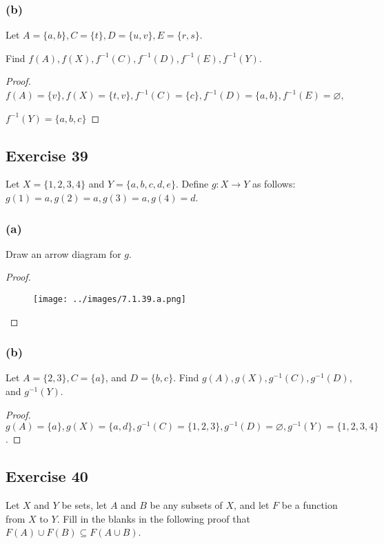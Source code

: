 \documentclass[14pt]{extarticle}
\newcommand{\es}{\varnothing}
\begin{document}
\subsubsection{(b)}
Let \(A = \{a, b\}, C = \{t\}, D = \{u, v\}, E = \{r, s\}\).

Find \(f(A), f(X), f^{-1}(C), f^{-1}(D), f^{-1}(E), f^{-1}(Y)\).

\begin{proof}
    \(f(A) = \{v\}, f(X) = \{t, v\}, f^{-1}(C) = \{c\}, f^{-1}(D) = \{a, b\}, f^{-1}(E) = \es\),

    \(f^{-1}(Y) = \{a,b,c\}\)
\end{proof}

\subsection{Exercise 39}
Let \(X = \{1, 2, 3, 4\}\) and \(Y = \{a, b, c, d, e\}\). Define \(g: X \to Y\) as follows:
\(g(1) = a, g(2) = a, g(3) = a, g(4) = d\).

\subsubsection{(a)}
Draw an arrow diagram for $g$.

\begin{proof}
    \begin{figure}[ht!]
        \centering
        \texttt{[image: ../images/7.1.39.a.png]}
    \end{figure}
\end{proof}

\subsubsection{(b)}
Let \(A = \{2, 3\}, C = \{a\}\), and \(D = \{b, c\}\). Find \(g(A), g(X), g^{-1}(C), g^{-1}(D)\), and \(g^{-1}(Y)\).

\begin{proof}
    \(g(A) = \{a\}, g(X) = \{a, d\}, g^{-1}(C) = \{1, 2, 3\}, g^{-1}(D) = \es, g^{-1}(Y) = \{1, 2, 3, 4\}\).
\end{proof}

\subsection{Exercise 40}
Let $X$ and $Y$ be sets, let $A$ and $B$ be any subsets of $X$, and let $F$ be a function from $X$ to $Y$. Fill in the
blanks in the following proof that \(F(A) \cup F (B) \subseteq F(A \cup B)\).
\end{document}
